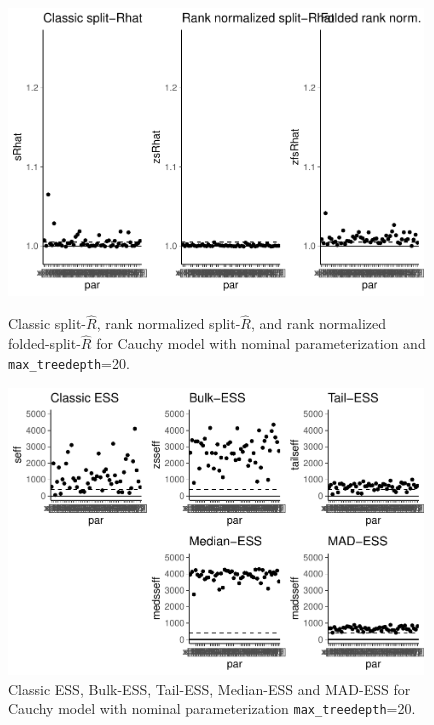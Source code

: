 \documentclass[american,]{article}
\theoremstyle{definition}
\begin{document}
\begin{figure}[tp]
  \centering
  \begin{minipage}{0.48\textwidth}
  \includegraphics[width=0.98\textwidth]{graphics/rhat-fit-nom-td20-1.pdf}
  \caption{Classic split-\(\widehat{R}\), rank normalized
    split-\(\widehat{R}\), and rank normalized
    folded-split-\(\widehat{R}\) for Cauchy model with nominal
    parameterization and \texttt{max\_treedepth}=20.}
  \label{fig:rhat-fit-nom-td20-1}
\end{minipage}
\hfill
  \begin{minipage}{0.48\textwidth}
  \includegraphics[width=0.98\textwidth]{graphics/ess-fit-nom-td20-1.pdf}
  \caption{Classic ESS, Bulk-ESS, Tail-ESS, Median-ESS and MAD-ESS for
    Cauchy model with nominal parameterization \texttt{max\_treedepth}=20.}
  \label{fig:ess-fit-nom-td20-1}
\end{minipage}
\end{figure}
\end{document}
